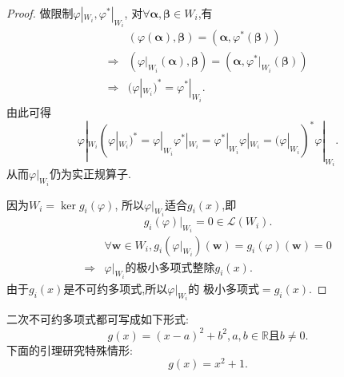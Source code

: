 \begin{proof}
  做限制$\varphi|_{W_i}, \varphi^*|_{W_i}$,
  对$\forall \bm{\alpha}, \bm{\beta}\in W_i$,有
  \begin{align*}
    & (\varphi(\bm{\alpha}), \bm{\beta})=(\bm{\alpha},\varphi^*(\bm{\beta}))\\
    \Longrightarrow & (\varphi|_{W_i}(\bm{\alpha}),\bm{\beta})=(\bm{\alpha},\varphi^*|_{W_i}(\bm{\beta}))\\
    \Longrightarrow & (\varphi|_{W_i})^*=\varphi^*|_{W_i}.
  \end{align*}
  由此可得
  \[
    \varphi|_{W_i}(\varphi|_{W_i})^*=\varphi|_{W_i}\varphi^*|_{W_i}=
    \varphi^*|_{W_i}\varphi|_{W_i}=(\varphi|_{W_i})^*\varphi|_{W_i}.
  \]
  从而$\varphi|_{W_i}$仍为实正规算子.

  因为$W_i=\ker g_i(\varphi)$,
  所以$\varphi|_{W_i}$适合$g_i(x)$,即
  \[
    g_i(\varphi)|_{W_i}=0 \in \mathscr{L}(W_i).
  \]
  \begin{align*}
    &\forall \bm{w}\in W_i, g_i(\varphi|_{W_i})(\bm{w})=g_i(\varphi)(\bm{w})=0\\
    \Longrightarrow & \varphi|_{W_i}\text{的极小多项式整除}g_i(x).
  \end{align*}
  由于$g_i(x)$是不可约多项式,所以$\varphi|_{W_i}$的
  极小多项式$=g_i(x)$.
\end{proof}

\begin{remark}
  二次不可约多项式都可写成如下形式:
  \[
    g(x)=(x-a)^2+b^2, a,b\in\mathbb{R}\text{且}b\neq 0.
  \]
  下面的引理研究特殊情形:
  \[
    g(x)=x^2+1.
  \]
\end{remark}
